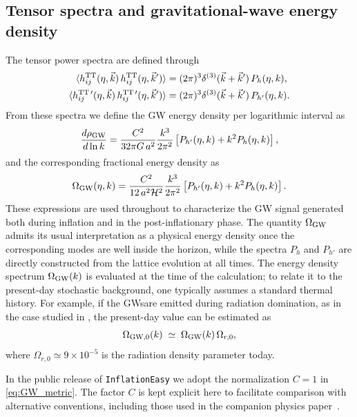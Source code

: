 \documentclass[aps, nofootinbib,superscriptaddress, preprintnumbers, longbibliography]{article}
\begin{document}
\subsection{Tensor spectra and gravitational-wave energy density}
The tensor power spectra are defined through
\begin{align}
\label{eq:GW_Pdef}
\langle h_{ij}^{\rm TT}(\eta,\vec{k})\, h_{ij}^{\rm TT}(\eta,\vec{k}') \rangle
&= (2\pi)^3 \delta^{(3)}(\vec{k}+\vec{k}')\, P_h(\eta,k), \\
\langle h_{ij}^{{\rm TT}\,\prime}(\eta,\vec{k})\, h_{ij}^{{\rm TT}\,\prime}(\eta,\vec{k}') \rangle
&= (2\pi)^3 \delta^{(3)}(\vec{k}+\vec{k}')\, P_{h'}(\eta,k).
\end{align}
From these spectra we define the GW energy density per logarithmic interval as
\begin{equation}
\label{eq:GW_rho}
\frac{d\rho_{\rm GW}}{d\ln k}
=
\frac{C^2}{32\pi G\,a^2}
\frac{k^3}{2\pi^2}
\left[
P_{h'}(\eta,k) + k^2 P_h(\eta,k)
\right],
\end{equation}
and the corresponding fractional energy density as
\begin{equation}
\label{eq:GW_Omega}
\Omega_{\rm GW}(\eta,k)
=
\frac{C^2}{12\,a^2\mathcal{H}^2}
\frac{k^3}{2\pi^2}
\left[
P_{h'}(\eta,k) + k^2 P_h(\eta,k)
\right].
\end{equation}
These expressions are used throughout to characterize the GW signal generated both during inflation and in the post-inflationary phase. The quantity $\Omega_{\rm GW}$ admits its usual interpretation as a physical energy density once the corresponding modes are well inside the horizon, while the spectra $P_h$ and $P_{h'}$ are directly constructed from the lattice evolution at all times. The energy density spectrum $\Omega_{\rm GW}(k)$ is evaluated at the time of the calculation; to relate it to the present-day stochastic background, one typically assumes a standard thermal history. For example, if the GWsare emitted during radiation domination, as in the case studied in \cite{gwpaper}, the present-day value can be estimated as
\[
\Omega_{\rm GW,0}(k)\;\simeq\;\Omega_{\rm GW}(k)\,\Omega_{r,0},
\]
where $\Omega_{r,0}\simeq 9\times10^{-5}$ is the radiation density parameter today.


In the public release of \texttt{InflationEasy} we adopt the normalization $C=1$ in \cref{eq:GW_metric}. The factor $C$ is kept explicit here to facilitate comparison with alternative conventions, including those used in the companion physics paper~\cite{gwpaper}.
\end{document}
